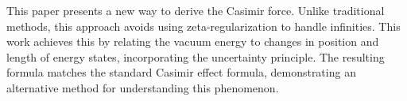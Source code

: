 This paper presents a new way to derive the Casimir force.
Unlike traditional methods, this approach avoids using zeta-regularization to handle infinities. 
This work achieves this by relating the vacuum energy to changes in position and length of energy states, 
incorporating the uncertainty principle. 
The resulting formula matches the standard Casimir effect formula, demonstrating an alternative method for understanding this phenomenon.